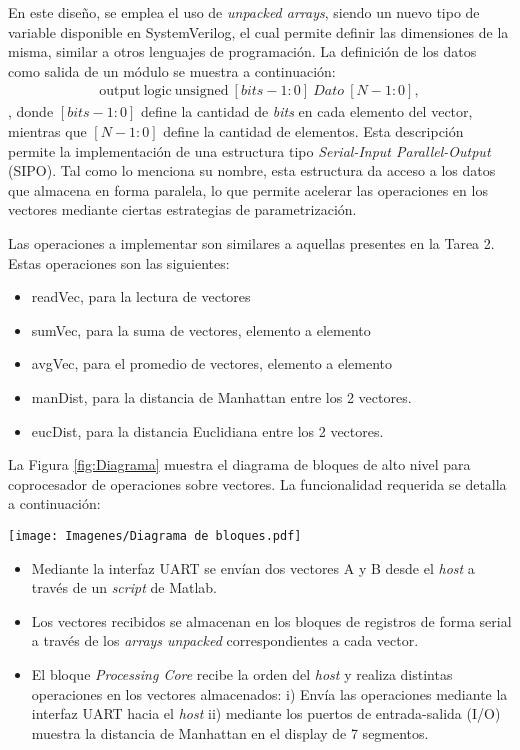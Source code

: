 \documentclass[conference]{IEEEtran}
\begin{document}
    En este diseño, se emplea el uso de \textit{unpacked arrays}, siendo un nuevo tipo de variable disponible en SystemVerilog, el cual permite definir las dimensiones de la misma, similar a otros lenguajes de programación. La definición de los datos como  salida de un módulo  se muestra a continuación:
    \begin{align}
       \text{output}  \ \text{logic}  \ \text{unsigned}  \ [bits-1:0] \ Dato \ [N - 1:0],
    \end{align}
 , donde $[bits-1:0] $ define la cantidad de \textit{bits} en cada elemento del vector, mientras que $[N - 1:0]$ define la cantidad de elementos. Esta descripción permite la implementación de una estructura tipo \textit{Serial-Input Parallel-Output}  (SIPO). Tal como lo menciona su nombre, esta estructura da acceso a los datos que almacena en forma paralela, lo que permite acelerar las operaciones en los vectores mediante ciertas estrategias de parametrización. \par
 Las operaciones a implementar son similares a aquellas presentes en la Tarea 2. Estas operaciones son las siguientes:
\begin{itemize}
    \item readVec, para la lectura de vectores
    \item sumVec, para la suma de vectores, elemento a elemento
    \item avgVec, para el promedio de vectores, elemento a elemento
    \item manDist, para la distancia de Manhattan entre los 2 vectores.
    \item eucDist, para la distancia Euclidiana entre los 2 vectores.
\end{itemize}
 La Figura \ref{fig:Diagrama}  muestra el diagrama de bloques de alto nivel para coprocesador de operaciones sobre vectores. La funcionalidad requerida se detalla a continuación:
        \begin{figure*}[]
    \centering
    \texttt{[image: Imagenes/Diagrama de bloques.pdf]}
    \caption{Diagrama de bloques de alto nivel para el coprocesador para operaciones sobre vectores.}
    \label{fig:Diagrama}
\end{figure*}
\vspace{0.2cm}
 \begin{itemize}
\setlength\itemsep{1em}
    \item Mediante la interfaz UART se envían dos vectores A y B desde el \textit{host} a través de un \textit{script} de Matlab.
    \item Los vectores recibidos se almacenan en los bloques de registros de forma serial a través de los \textit{arrays unpacked } correspondientes a cada vector. 
    \item El bloque \textit{Processing Core} recibe la orden del \textit{host} y realiza distintas operaciones en los vectores almacenados: i) Envía las operaciones mediante la interfaz UART hacia el \textit{host} ii) mediante los puertos de entrada-salida (I/O) muestra la distancia de Manhattan en el display de 7 segmentos.
\end{itemize}
\end{document}
